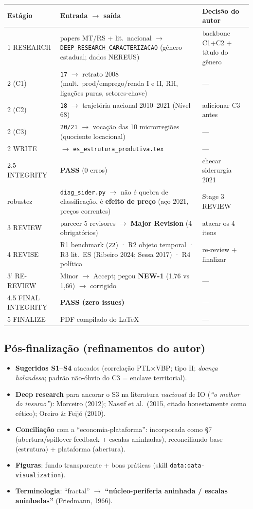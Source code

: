 \documentclass[12pt,a4paper]{article}
\begin{document}
\begin{longtable}{p{2.6cm}p{8.3cm}p{3.4cm}}
\toprule
\textbf{Estágio} & \textbf{Entrada $\to$ saída} & \textbf{Decisão do autor} \\
\midrule
1 RESEARCH & papers MT/RS + lit.\ nacional $\to$ \texttt{DEEP\_RESEARCH\_CARACTERIZACAO} (gênero estadual; dados NEREUS) & backbone C1+C2 + título do gênero \\
2 (C1) & \texttt{17} $\to$ retrato 2008 (mult.\ prod/emprego/renda I e II, RH, ligações puras, setores-chave) & — \\
2 (C2) & \texttt{18} $\to$ trajetória nacional 2010--2021 (Nível 68) & adicionar C3 antes \\
2 (C3) & \texttt{20/21} $\to$ vocação das 10 microrregiões (quociente locacional) & — \\
2 WRITE & $\to$ \texttt{es\_estrutura\_produtiva.tex} & — \\
2.5 INTEGRITY & \textbf{PASS} (0 erros) & checar siderurgia 2021 \\
robustez & \texttt{diag\_sider.py} $\to$ não é quebra de classificação, é \textbf{efeito de preço} (aço 2021, preços correntes) & Stage 3 REVIEW \\
3 REVIEW & parecer 5-revisores $\to$ \textbf{Major Revision} (4 obrigatórios) & atacar os 4 itens \\
4 REVISE & R1 benchmark (\texttt{22}) · R2 objeto temporal · R3 lit.\ ES (Ribeiro 2024; Sessa 2017) · R4 política & re-review + finalizar \\
3' RE-REVIEW & Minor $\to$ Accept; pegou \textbf{NEW-1} (1,76 vs 1,66) $\to$ corrigido & — \\
4.5 FINAL INTEGRITY & \textbf{PASS (zero issues)} & — \\
5 FINALIZE & PDF compilado do LaTeX & — \\
\bottomrule
\end{longtable}

\subsection{Pós-finalização (refinamentos do autor)}
\begin{itemize}\setlength\itemsep{1pt}
\item \textbf{Sugeridos S1--S4} atacados (correlação PTL$\times$VBP; tipo II; \emph{doença holandesa};
  padrão não-óbvio do C3 = enclave territorial).
\item \textbf{Deep research} para ancorar o S3 na literatura \emph{nacional} de IO (\emph{``o melhor do
  insumo''}): Morceiro (2012); Nassif et al.\ (2015, citado honestamente como cético); Oreiro \& Feijó (2010).
\item \textbf{Conciliação} com a ``economia-plataforma'': incorporada como §7 (abertura/spillover-feedback
  + escalas aninhadas), reconciliando base (estrutura) + plataforma (abertura).
\item \textbf{Figuras}: fundo transparente + boas práticas (skill \texttt{data:data-visualization}).
\item \textbf{Terminologia}: ``fractal'' $\to$ \textbf{``núcleo-periferia aninhada / escalas aninhadas''}
  (Friedmann, 1966).
\end{itemize}
\end{document}
